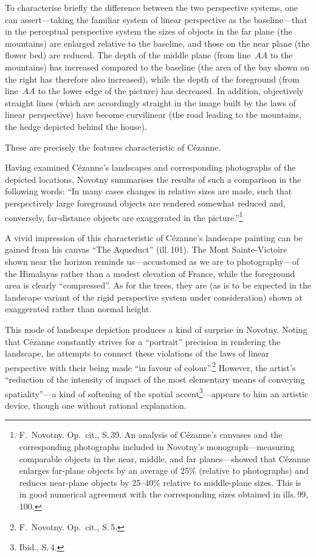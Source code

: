 To characterise briefly the difference between the two perspective systems, one can
assert---taking the familiar system of linear perspective as the baseline---that in
the perceptual perspective system the sizes of objects in the far plane (the
mountains) are enlarged relative to the baseline, and those on the near plane (the
flower bed) are reduced. The depth of the middle plane (from line~$AA$ to the
mountains) has increased compared to the baseline (the area of the bay shown on the
right has therefore also increased), while the depth of the foreground (from
line~$AA$ to the lower edge of the picture) has decreased. In addition, objectively
straight lines (which are accordingly straight in the image built by the laws of
linear perspective) have become curvilinear (the road leading to the mountains, the
hedge depicted behind the house).

These are precisely the features characteristic of Cézanne.

Having examined Cézanne's landscapes and corresponding photographs of the depicted
locations, Novotny summarises the results of such a comparison in the following
words: ``In many cases changes in relative sizes are made, such that perspectively
large foreground objects are rendered somewhat reduced and, conversely, far-distance
objects are exaggerated in the
picture.''\footnote{F.~Novotny. Op.~cit., S.\,39.
  An analysis of Cézanne's canvases and the corresponding photographs included in
  Novotny's monograph---measuring comparable objects in the near, middle, and far
  planes---showed that Cézanne enlarges far-plane objects by an average of 25\%
  (relative to photographs) and reduces near-plane objects by 25--40\% relative to
  middle-plane sizes. This is in good numerical agreement with the corresponding
  sizes obtained in ills.\,99, 100.}


A vivid impression of this characteristic of Cézanne's landscape painting can be
gained from his canvas ``The Aqueduct'' (ill.\,101). The Mont Sainte-Victoire shown
near the horizon reminds us---accustomed as we are to photography---of the
Himalayas rather than a modest elevation of France, while the foreground area is
clearly ``compressed''. As for the trees, they are (as is to be expected in the
landscape variant of the rigid perspective system under consideration) shown at
exaggerated rather than normal height.

This mode of landscape depiction produces a kind of surprise in Novotny. Noting
that Cézanne constantly strives for a ``portrait'' precision in rendering the
landscape, he attempts to connect these violations of the laws of linear perspective
with their being made ``in favour of colour''.\footnote{F.~Novotny. Op.~cit.,
  S.\,5.} However, the artist's ``reduction of the intensity of impact of the most
elementary means of conveying spatiality''---a kind of softening of the spatial
accent\footnote{Ibid., S.\,4.}---appears to him an artistic device, though one
without rational explanation.

